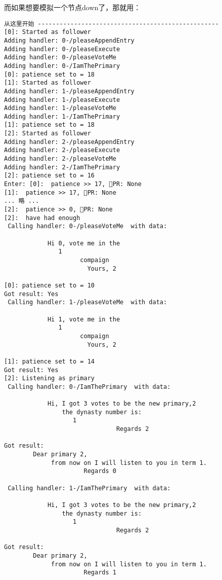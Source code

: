 而如果想要模拟一个节点down了，那就用：
\begin{center}
   
\end{center}

 \begin{tcolorbox}[breakable,title=Raft共识模拟的命令行输出（部分没啥用的输出被省略了）]
  \begin{verbatim}
从这里开始 --------------------------------------------------
[0]: Started as follower
Adding handler: 0-/pleaseAppendEntry
Adding handler: 0-/pleaseExecute
Adding handler: 0-/pleaseVoteMe
Adding handler: 0-/IamThePrimary
[0]: patience set to = 18
[1]: Started as follower
Adding handler: 1-/pleaseAppendEntry
Adding handler: 1-/pleaseExecute
Adding handler: 1-/pleaseVoteMe
Adding handler: 1-/IamThePrimary
[1]: patience set to = 18
[2]: Started as follower
Adding handler: 2-/pleaseAppendEntry
Adding handler: 2-/pleaseExecute
Adding handler: 2-/pleaseVoteMe
Adding handler: 2-/IamThePrimary
[2]: patience set to = 16
Enter: [0]:  patience >> 17, 🐢PR: None
[1]:  patience >> 17, 🐢PR: None
... 略 ... 
[2]:  patience >> 0, 🐢PR: None
[2]:  have had enough
 Calling handler: 0-/pleaseVoteMe  with data:
  
            Hi 0, vote me in the
               1
                     compaign
                       Yours, 2
             
[0]: patience set to = 10
Got result: Yes 
 Calling handler: 1-/pleaseVoteMe  with data:
  
            Hi 1, vote me in the
               1
                     compaign
                       Yours, 2
             
[1]: patience set to = 14
Got result: Yes 
[2]: Listening as primary
 Calling handler: 0-/IamThePrimary  with data:
  
            Hi, I got 3 votes to be the new primary,2
                the dynasty number is:
                   1
                               Regards 2
             
Got result: 
        Dear primary 2,
             from now on I will listen to you in term 1.
                      Regards 0
         
 Calling handler: 1-/IamThePrimary  with data:
  
            Hi, I got 3 votes to be the new primary,2
                the dynasty number is:
                   1
                               Regards 2
             
Got result: 
        Dear primary 2,
             from now on I will listen to you in term 1.
                      Regards 1
         

\end{verbatim}
\end{tcolorbox}
